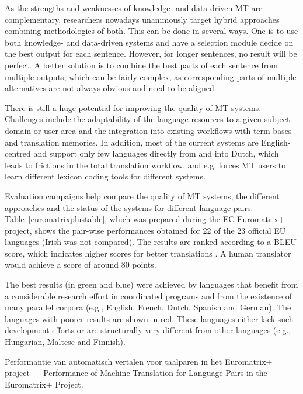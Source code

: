 \documentclass{scrartcl}
\begin{document}
\begin{Parallel}[c]{70mm}{70mm}
{    As the strengths and weaknesses of knowledge- and data-driven MT are complementary, researchers nowadays unanimously target hybrid approaches combining methodologies of both. This can be done in several ways. One is to use both knowledge- and data-driven systems and have a selection module decide on the best output for each sentence. However, for longer sentences, no result will be perfect. A better solution is to combine the best parts of each sentence from multiple outputs, which can be fairly complex, as corresponding parts of multiple alternatives are not always obvious and need to be aligned.

   

    There is still a huge potential for improving the quality of MT systems. Challenges include the adaptability of the language resources to a given subject domain or user area and the integration into existing workflows with term bases and translation memories. In addition, most of the current systems are English-centred and support only few languages directly from and into Dutch, which leads to frictions in the total translation workflow, and e.g. forces MT users to learn different lexicon coding tools for different systems.

    Evaluation campaigns help compare the quality of MT systems, the different approaches and the status of the systems for different language pairs. Table~\ref{euromatrixplustable}, which was prepared during the EC Euromatrix+ project, shows the pair-wise performances obtained for 22 of the 23 official EU languages (Irish was not compared). The results are ranked according to a BLEU score, which indicates higher scores for better translations \cite{bleu1}.   A human translator would achieve a score of around 80 points.

    The best results (in green and blue) were achieved by languages that benefit from a considerable research effort in coordinated programs and from the existence of many parallel corpora (e.g., English, French, Dutch, Spanish and German). The languages with poorer results are shown in red. These languages either lack such development efforts or are structurally very different from other languages (e.g., Hungarian, Maltese and Finnish).



  }

  \ParallelPar

\begin{table}
\caption{Performantie van automatisch vertalen voor taalparen in het Euromatrix+ project --- Performance of Machine Translation for Language Pairs in the Euromatrix+ Project.}
\label{euromatrixplustable}
\end{table}



\end{Parallel}
\end{document}
